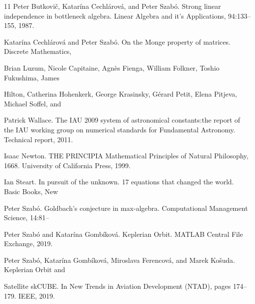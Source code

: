 \documentclass[conference]{IEEEtran}
\begin{document}
\begin{thebibliography}{11}
Peter Butkovič, Katarína Cechlárová, and Peter Szabó. Strong linear independence in bottleneck algebra. Linear Algebra and it's Applications, 94:133--155, 1987.

Katarína Cechlárová and Peter Szabó. On the Monge property of matrices. Discrete Mathematics,

Brian Luzum, Nicole Capitaine, Agnès Fienga, William Folkner, Toshio Fukushima, James

Hilton, Catherina Hohenkerk, George Krasinsky, Gérard Petit, Elena Pitjeva, Michael Soffel, and

Patrick Wallace. The IAU 2009 system of astronomical constants:the report of the IAU working group on numerical standards for Fundamental Astronomy. Technical report, 2011.

Isaac Newton. THE PRINCIPIA Mathematical Principles of Natural Philosophy, 1668. University of California Press, 1999.

Ian Steart. In pursuit of the unknown. 17 equations that changed the world. Basic Books, New

Peter Szabó. Goldbach's conjecture in max-algebra. Computational Management Science, 14:81--

Peter Szabó and Katarína Gombíková. Keplerian Orbit. MATLAB Central File Exchange, 2019.

Peter Szabó, Katarína Gombíková, Miroslava Ferencová, and Marek Košuda. Keplerian Orbit and

Satellite skCUBE. In New Trends in Aviation Development (NTAD), pages 174--179. IEEE, 2019.

\end{thebibliography}
\end{document}
